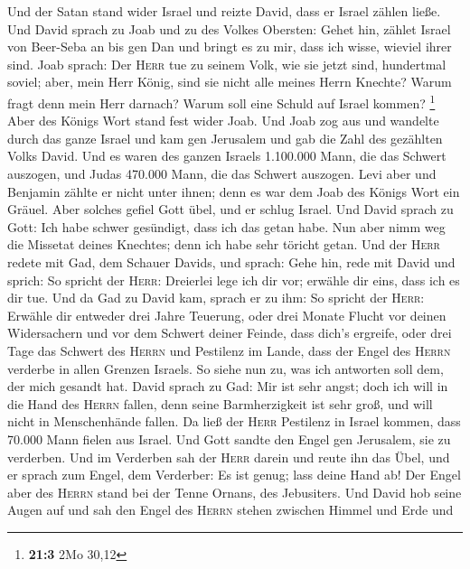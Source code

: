  Und der Satan stand wider Israel und reizte David, dass
er Israel zählen ließe.  Und David sprach zu Joab und zu
des Volkes Obersten: Gehet hin, zählet Israel von Beer-Seba an bis gen
Dan und bringt es zu mir, dass ich wisse, wieviel ihrer sind.
 Joab sprach: Der \textsc{Herr} tue zu seinem Volk, wie
sie jetzt sind, hundertmal soviel; aber, mein Herr König, sind sie nicht
alle meines Herrn Knechte? Warum fragt denn mein Herr darnach? Warum
soll eine Schuld auf Israel kommen? \footnote{\textbf{21:3} 2Mo 30,12}
 Aber des Königs Wort stand fest wider Joab. Und Joab zog
aus und wandelte durch das ganze Israel und kam gen Jerusalem
 und gab die Zahl des gezählten Volks David. Und es waren
des ganzen Israels 1.100.000 Mann, die das Schwert auszogen, und Judas
470.000 Mann, die das Schwert auszogen.  Levi aber und
Benjamin zählte er nicht unter ihnen; denn es war dem Joab des Königs
Wort ein Gräuel.  Aber solches gefiel Gott übel, und er
schlug Israel.  Und David sprach zu Gott: Ich habe schwer
gesündigt, dass ich das getan habe. Nun aber nimm weg die Missetat
deines Knechtes; denn ich habe sehr töricht getan.  Und
der \textsc{Herr} redete mit Gad, dem Schauer Davids, und sprach:
 Gehe hin, rede mit David und sprich: So spricht der
\textsc{Herr}: Dreierlei lege ich dir vor; erwähle dir eins, dass ich es
dir tue.  Und da Gad zu David kam, sprach er zu ihm: So
spricht der \textsc{Herr}: Erwähle dir  entweder drei
Jahre Teuerung, oder drei Monate Flucht vor deinen Widersachern und vor
dem Schwert deiner Feinde, dass dich's ergreife, oder drei Tage das
Schwert des \textsc{Herrn} und Pestilenz im Lande, dass der Engel des
\textsc{Herrn} verderbe in allen Grenzen Israels. So siehe nun zu, was
ich antworten soll dem, der mich gesandt hat.  David
sprach zu Gad: Mir ist sehr angst; doch ich will in die Hand des
\textsc{Herrn} fallen, denn seine Barmherzigkeit ist sehr groß, und will
nicht in Menschenhände fallen.  Da ließ der \textsc{Herr}
Pestilenz in Israel kommen, dass 70.000 Mann fielen aus Israel.
 Und Gott sandte den Engel gen Jerusalem, sie zu
verderben. Und im Verderben sah der \textsc{Herr} darein und reute ihn
das Übel, und er sprach zum Engel, dem Verderber: Es ist genug; lass
deine Hand ab! Der Engel aber des \textsc{Herrn} stand bei der Tenne
Ornans, des Jebusiters.  Und David hob seine Augen auf
und sah den Engel des \textsc{Herrn} stehen zwischen Himmel und Erde und
